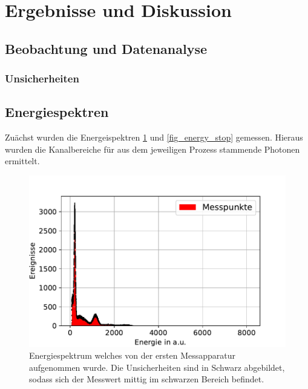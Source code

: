 \documentclass[
	a4paper,
	12pt,
	pagesize,
	ngerman
]{scrartcl}
\begin{document}
	\section{Ergebnisse und Diskussion}


	\subsection{Beobachtung und Datenanalyse}
	\subsubsection{Unsicherheiten}

	\subsection{Energiespektren}
	Zuächst wurden die Energeispektren \cref{fig_energy_start} und \cref{fig_energy_stop} gemessen. Hieraus wurden die Kanalbereiche für aus dem jeweiligen Prozess stammende Photonen ermittelt.


	\begin{figure}[H]
				\includegraphics[width= 0.9 \linewidth]{img/Energiespektrum_Start}
				\caption{
				Energiespektrum welches von der ersten Messapparatur aufgenommen wurde.
				Die Unsicherheiten sind in Schwarz abgebildet, sodass sich der Messwert mittig im schwarzen Bereich befindet.
				}
				\label{fig_energy_start}
		\end{figure}
\end{document}
